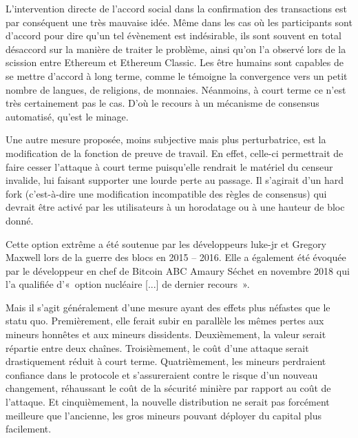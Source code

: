 L'intervention directe de l'accord social dans la confirmation des transactions est par conséquent une très mauvaise idée. Même dans les cas où les participants sont d'accord pour dire qu'un tel évènement est indésirable, ils sont souvent en total désaccord sur la manière de traiter le problème, ainsi qu'on l'a observé lors de la scission entre Ethereum et Ethereum Classic. Les être humains sont capables de se mettre d'accord à long terme, comme le témoigne la convergence vers un petit nombre de langues, de religions, de monnaies. Néanmoins, à court terme ce n'est très certainement pas le cas. D'où le recours à un mécanisme de consensus automatisé, qu'est le minage.


Une autre mesure proposée, moins subjective mais plus perturbatrice, est la modification de la fonction de preuve de travail. En effet, celle-ci permettrait de faire cesser l'attaque à court terme puisqu'elle rendrait le matériel du censeur invalide, lui faisant supporter une lourde perte au passage. Il s'agirait d'un hard fork (c'est-à-dire une modification incompatible des règles de consensus) qui devrait être activé par les utilisateurs à un horodatage ou à une hauteur de bloc donné.

Cette option extrême a été soutenue par les développeurs luke-jr et Gregory Maxwell lors de la guerre des blocs en 2015 -- 2016. Elle a également été évoquée par le développeur en chef de Bitcoin ABC Amaury Séchet en novembre 2018 qui l'a qualifiée d'«~option nucléaire [...] de dernier recours~».

Mais il s'agit généralement d'une mesure ayant des effets plus néfastes que le statu quo. Premièrement, elle ferait subir en parallèle les mêmes pertes aux mineurs honnêtes et aux mineurs dissidents. Deuxièmement, la valeur serait répartie entre deux chaînes. Troisièmement, le coût d'une attaque serait drastiquement réduit à court terme. Quatrièmement, les mineurs perdraient confiance dans le protocole et s'assureraient contre le risque d'un nouveau changement, réhaussant le coût de la sécurité minière par rapport au coût de l'attaque. Et cinquièmement, la nouvelle distribution ne serait pas forcément meilleure que l'ancienne, les gros mineurs pouvant déployer du capital plus facilement.

